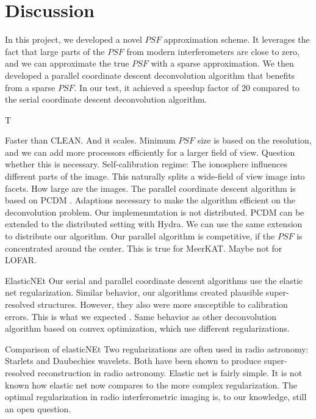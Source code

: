 \section{Discussion}\label{discussion}
In this project, we developed a novel $PSF$ approximation scheme. It leverages the fact that large parts of the $PSF$ from modern interferometers are close to zero, and we can approximate the true $PSF$ with a sparse approximation. We then developed a parallel coordinate descent deconvolution algorithm that benefits from a sparse $PSF$. In our test, it achieved a speedup factor of 20 compared to the serial coordinate descent deconvolution algorithm.

T

Faster than CLEAN. And it scales. Minimum $PSF$ size is based on the resolution, and we can add more processors efficiently for a larger field of view.
Question whether this is necessary.
Self-calibration regime: The ionosphere influences different parts of the image. This naturally splits a wide-field of view image into facets. How large are the images.
The parallel coordinate descent algorithm is based on PCDM \cite{richtarik2016parallel}. Adaptions necessary to make the algorithm efficient on the deconvolution problem. Our implemenmtation is not distributed. PCDM can be extended to the distributed setting with Hydra. We can use the same extension to distribute our algorithm.
Our parallel algorithm is competitive, if the $PSF$ is concentrated around the center. This is true for MeerKAT. Maybe not for LOFAR.

ElasticNEt
Our serial and parallel coordinate descent algorithms use the elastic net regularization.
Similar behavior, our algorithms created plausible super-resolved structures. However, they also were more susceptible to calibration errors.
This is what we expected \cite{offringa2017optimized}. Same behavior as other deconvolution algorithm based on convex optimization, which use different regularizations.

Comparison of elasticNEt
Two regularizations are often used in radio astronomy: Starlets \cite{starck2015starlet} and Daubechies wavelets\cite{carrillo2014purify}. Both have been shown to produce super-resolved reconstruction in radio astronomy\cite{dabbech2015moresane, dabbech2018cygnus}. Elastic net is fairly simple. It is not known how elastic net now compares to the more complex regularization.
The optimal regularization in radio interferometric imaging is, to our knowledge, still an open question. 

